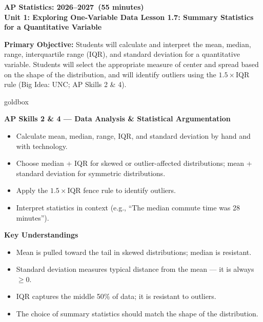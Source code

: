 \documentclass[10pt]{article}
\begin{document}
\def\CourseName{AP Statistics}
\def\SchoolYear{2026--2027}
\def\MeetingLength{55 minutes}
\def\UnitNumberName{Unit 1: Exploring One-Variable Data \quad}
\def\LessonNumberName{Lesson 1.7: Summary Statistics for a Quantitative Variable}

\begin{center}
    {\Large\bfseries \CourseName: \SchoolYear\ (\MeetingLength) \\
    {\small\bfseries \UnitNumberName \LessonNumberName}}
\end{center}

\begin{tcolorbox}[colback=sky,colframe=navy,boxrule=0.9pt,arc=2mm,
    left=2mm,right=2mm,top=1.5mm,bottom=1.5mm]
    \textbf{Primary Objective:} Students will calculate and interpret the mean, median, range,
    interquartile range (IQR), and standard deviation for a quantitative variable. Students will
    select the appropriate measure of center and spread based on the shape of the distribution,
    and will identify outliers using the $1.5 \times \text{IQR}$ rule (Big Idea: UNC; AP Skills 2 \& 4).
\end{tcolorbox}

\begin{skillbox}{goldbox}
\begin{minipage}[t]{0.48\linewidth}
    \textbf{AP Skills 2 \& 4 --- Data Analysis \& Statistical Argumentation}
    \begin{itemize}
        \item Calculate mean, median, range, IQR, and standard deviation by hand and with technology.
        \item Choose median + IQR for skewed or outlier-affected distributions; mean + standard deviation for symmetric distributions.
        \item Apply the $1.5 \times \text{IQR}$ fence rule to identify outliers.
        \item Interpret statistics in context (e.g., ``The median commute time was 28 minutes'').
    \end{itemize}
\end{minipage}
\hfill
\begin{minipage}[t]{0.48\linewidth}
    \textbf{Key Understandings}
    \begin{itemize}
        \item Mean is pulled toward the tail in skewed distributions; median is resistant.
        \item Standard deviation measures typical distance from the mean --- it is always $\geq 0$.
        \item IQR captures the middle 50\% of data; it is resistant to outliers.
        \item The choice of summary statistics should match the shape of the distribution.
    \end{itemize}
\end{minipage}
\end{skillbox}
\end{document}
